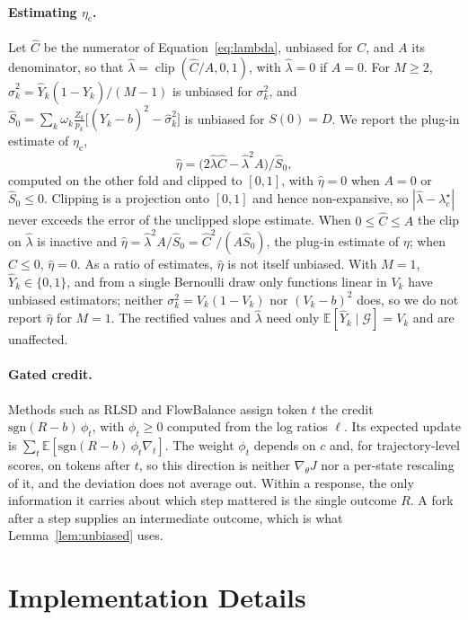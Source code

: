 \documentclass[11pt]{article}
\newcommand{\Yh}{\hat Y}
\newcommand{\E}{\mathbb{E}}
\newcommand{\G}{\mathcal{G}}
\newcommand{\clip}{\operatorname{clip}}
\newcommand{\lamc}{\lambda^\star_{\mathrm c}}
\newcommand{\etac}{\eta_{\mathrm c}}
\theoremstyle{remark}
\begin{document}
\paragraph{Estimating $\etac$.}
Let $\hat C$ be the numerator of Equation~\eqref{eq:lambda}, unbiased for $C$, and $A$ its denominator, so that $\hat\lambda=\clip(\hat C/A,0,1)$, with $\hat\lambda=0$ if $A=0$. For $M\ge2$, $\hat\sigma_k^2=\Yh_k(1-\Yh_k)/(M-1)$ is unbiased for $\sigma_k^2$, and $\hat S_0=\sum_k\omega_k\frac{Z_k}{p_k}\bigl[(\Yh_k-b)^2-\hat\sigma_k^2\bigr]$ is unbiased for $S(0)=D$. We report the plug-in estimate of $\etac$,
\begin{equation*}
\hat\eta=\bigl(2\hat\lambda\hat C-\hat\lambda^2A\bigr)/\hat S_0,
\end{equation*}
computed on the other fold and clipped to $[0,1]$, with $\hat\eta=0$ when $A=0$ or $\hat S_0\le0$. Clipping is a projection onto $[0,1]$ and hence non-expansive, so $|\hat\lambda-\lamc|$ never exceeds the error of the unclipped slope estimate. When $0\le\hat C\le A$ the clip on $\hat\lambda$ is inactive and $\hat\eta=\hat\lambda^2A/\hat S_0=\hat C^2/(A\hat S_0)$, the plug-in estimate of $\eta$; when $\hat C\le0$, $\hat\eta=0$. As a ratio of estimates, $\hat\eta$ is not itself unbiased. With $M=1$, $\Yh_k\in\{0,1\}$, and from a single Bernoulli draw only functions linear in $V_k$ have unbiased estimators; neither $\sigma_k^2=V_k(1-V_k)$ nor $(V_k-b)^2$ does, so we do not report $\hat\eta$ for $M=1$. The rectified values and $\hat\lambda$ need only $\E[\Yh_k\mid\G]=V_k$ and are unaffected.

\paragraph{Gated credit.}
\label{app:gating}
Methods such as RLSD and FlowBalance assign token $t$ the credit $\mathrm{sgn}(R-b)\,\phi_t$, with $\phi_t\ge0$ computed from the log ratios $\ell$. Its expected update is $\sum_t\E[\mathrm{sgn}(R-b)\,\phi_t\nabla_t]$. The weight $\phi_t$ depends on $c$ and, for trajectory-level scores, on tokens after $t$, so this direction is neither $\nabla_\theta J$ nor a per-state rescaling of it, and the deviation does not average out. Within a response, the only information it carries about which step mattered is the single outcome $R$. A fork after a step supplies an intermediate outcome, which is what Lemma~\ref{lem:unbiased} uses.

\section{Implementation Details}
\label{app:impl}
\end{document}

